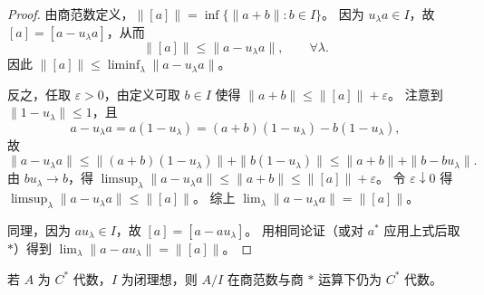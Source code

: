 \documentclass[lang=cn,a4paper,newtx,section]{elegantbook}
\begin{document}
  \begin{proof}
    由商范数定义，$\|[a]\|=\inf\{\|a+b\|:b\in I\}$。
    因为 $u_\lambda a\in I$，故 $[a]=[a-u_\lambda a]$，从而
    \begin{equation*}
      \|[a]\|\le \|a-u_\lambda a\|,\qquad \forall\lambda.
    \end{equation*}
    因此 $\|[a]\|\le \liminf_{\lambda}\|a-u_\lambda a\|$。

    反之，任取 $\varepsilon>0$，由定义可取 $b\in I$ 使得 $\|a+b\|\le \|[a]\|+\varepsilon$。
    注意到 $\|1-u_\lambda\|\le 1$，且
    \begin{equation*}
      a-u_\lambda a=a(1-u_\lambda)=(a+b)(1-u_\lambda)-b(1-u_\lambda),
    \end{equation*}
    故
    \begin{equation*}
      \|a-u_\lambda a\|\le \|(a+b)(1-u_\lambda)\|+\|b(1-u_\lambda)\|\le \|a+b\|+\|b-bu_\lambda\|.
    \end{equation*}
    由 $bu_\lambda\to b$，得 $\limsup_{\lambda}\|a-u_\lambda a\|\le \|a+b\|\le \|[a]\|+\varepsilon$。
    令 $\varepsilon\downarrow 0$ 得 $\limsup_{\lambda}\|a-u_\lambda a\|\le \|[a]\|$。
    综上 $\lim_{\lambda}\|a-u_\lambda a\|=\|[a]\|$。

    同理，因为 $au_\lambda\in I$，故 $[a]=[a-au_\lambda]$。
    用相同论证（或对 $a^*$ 应用上式后取 $*$）得到 $\lim_{\lambda}\|a-au_\lambda\|=\|[a]\|$。
  \end{proof}

  \begin{theorem}
    若 $A$ 为 $C^*$ 代数，$I$ 为闭理想，则 $A/I$ 在商范数与商 $*$ 运算下仍为 $C^*$ 代数。
  \end{theorem}
\end{document}
